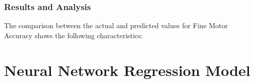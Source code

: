 
\subsubsection*{Results and Analysis}
The comparison between the actual and predicted values for Fine Motor Accuracy shows the following characteristics:




\section{Neural Network Regression Model}



